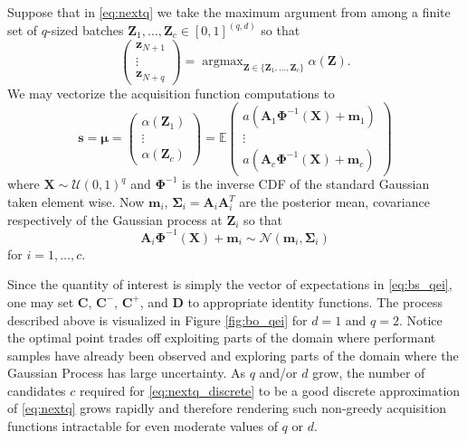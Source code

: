 \documentclass[graybox]{svmult}
\begin{document}
Suppose that in \eqref{eq:nextq} we take the maximum argument from among a finite set of $q$-sized batches $\boldsymbol{Z}_1,\dots,\boldsymbol{Z}_c \in [0,1]^{(q, d)}$ so that 
\begin{equation}
    \begin{pmatrix}\boldsymbol{z}_{N+1} \\ \vdots \\ \boldsymbol{z}_{N+q}\end{pmatrix} = \mathop{\text{argmax}}_{\boldsymbol{Z} \in \{\boldsymbol{Z}_1,\dots,\boldsymbol{Z}_c\}}\alpha(\boldsymbol{Z}).
    \label{eq:nextq_discrete}
\end{equation}
We may vectorize the acquisition function computations to 
\begin{equation}
    \boldsymbol{s} = \boldsymbol{\mu} = \begin{pmatrix} \alpha(\boldsymbol{Z}_1) \\ \vdots \\ \alpha(\boldsymbol{Z}_c)\end{pmatrix} = \mathbb{E}\begin{pmatrix}a\left(\boldsymbol{A}_1\boldsymbol{\Phi}^{-1}(\boldsymbol{X})+\boldsymbol{m}_1\right) \\ \vdots \\ a\left(\boldsymbol{A}_c\boldsymbol{\Phi}^{-1}(\boldsymbol{X})+\boldsymbol{m}_c\right)\end{pmatrix}
    \label{eq:bs_qei}
\end{equation}
where $\boldsymbol{X} \sim \mathcal{U}(0,1)^q$ and $\boldsymbol{\Phi}^{-1}$ is the inverse CDF of the standard Gaussian taken element wise. Now $\boldsymbol{m}_i$, $\boldsymbol{\Sigma}_i = \boldsymbol{A}_i\boldsymbol{A}_i^T$ are the posterior mean, covariance respectively of the Gaussian process at $\boldsymbol{Z}_i$ so that 
$$\boldsymbol{A}_i\boldsymbol{\Phi}^{-1}(\boldsymbol{X})+\boldsymbol{m}_i \sim \mathcal{N}\left(\boldsymbol{m}_i,\boldsymbol{\Sigma}_i\right)$$
for $i=1,\dots,c$.

Since the quantity of interest is simply the vector of expectations in \eqref{eq:bs_qei}, one may set $\boldsymbol{C}$, $\boldsymbol{C}^-$, $\boldsymbol{C}^+$, and $\boldsymbol{D}$ to appropriate identity functions. The process described above is visualized in Figure \ref{fig:bo_qei} for $d=1$ and $q=2$. Notice the optimal point trades off exploiting parts of the domain where performant samples have already been observed and  exploring parts of the domain where the Gaussian Process has large uncertainty.  As $q$ and/or $d$ grow, the number of candidates $c$ required for \eqref{eq:nextq_discrete} to be a good discrete approximation of \eqref{eq:nextq} grows rapidly and therefore rendering such non-greedy acquisition functions intractable for even moderate values of $q$ or $d$.
\end{document}
